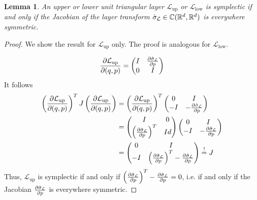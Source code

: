 \documentclass[twoside,a4paper]{article}
\newtheorem{lemma}{Lemma}
\begin{document}
\begin{lemma}\label{jacobi_symmetric}
	An upper or lower unit triangular layer $\mathcal{L}_{\text{up}}$ or $\mathcal{L}_{\text{low}}$
	is symplectic if and only if the Jacobian of the layer transform
	$\hat{\sigma}_{\mathcal{L}} \in \mathbb{C}(\mathbb{R}^d, \mathbb{R}^d)$ 
	is everywhere symmetric.
\end{lemma}
\begin{proof}
	We show the result for $\mathcal{L}_{\text{up}}$ only. 
	The proof is analogous for $\mathcal{L}_{\text{low}}$.

	\begin{equation*}
		\frac{\partial \mathcal{L}_{\text{up}}}{\partial (q,p)} = \begin{pmatrix}
			I & \frac{\partial \hat{\sigma}_{\mathcal{L}}}{\partial p} \\
			0 & I
		\end{pmatrix}
	\end{equation*}
	It follows
	\begin{align*}
		\left( \frac{\partial \mathcal{L}_{\text{up}}}{\partial (q,p)} \right)^T J \left( \frac{\partial \mathcal{L}_{\text{up}}}{\partial (q,p)} \right)
		&= \left( \frac{\partial \mathcal{L}_{\text{up}}}{\partial (q,p)} \right)^T \begin{pmatrix}
			0 & I \\
			-I & -\frac{\partial \hat{\sigma}_{\mathcal{L}}}{\partial p}
		\end{pmatrix} \\
		&= \begin{pmatrix}
			I & 0 \\
			\left( \frac{\partial \hat{\sigma}_{\mathcal{L}}}{\partial p} \right)^T & Id
		\end{pmatrix} \begin{pmatrix}
			0 & I \\
			-I & -\frac{\partial \hat{\sigma}_{\mathcal{L}}}{\partial p}
		\end{pmatrix} \\
		&= \begin{pmatrix}
			0 & I \\
			-I & \left( \frac{\partial \hat{\sigma}_{\mathcal{L}}}{\partial p} \right) ^T-\frac{\partial \hat{\sigma}_{\mathcal{L}}}{\partial p}
		\end{pmatrix} \overset{!}{=} J
	\end{align*}
	Thus, $\mathcal{L}_{\text{up}}$ is symplectic if and only if
	$\left( \frac{\partial \hat{\sigma}_{\mathcal{L}}}{\partial p} \right) ^T-\frac{\partial \hat{\sigma}_{\mathcal{L}}}{\partial p}=0$, 
	i.e. if and only if the Jacobian $\frac{\partial \hat{\sigma}_{\mathcal{L}}}{\partial p}$ is everywhere symmetric.
\end{proof}
\end{document}
